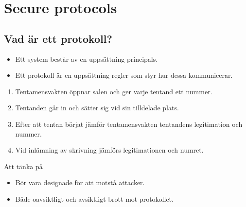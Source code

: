 \mode*




\section{Secure protocols}

\subsection{Vad är ett protokoll?}

\begin{frame}
  \begin{definition}[Protokoll]
    \begin{itemize}
      \item Ett system består av en uppsättning principals.
      \item Ett protokoll är en uppsättning regler som styr hur dessa 
        kommunicerar.
    \end{itemize}
  \end{definition}

  \pause{}

  \begin{example}
    \begin{enumerate}
      \item Tentamensvakten öppnar salen och ger varje tentand ett nummer.
      \item Tentanden går in och sätter sig vid sin tilldelade plats.
      \item Efter att tentan börjat jämför tentamensvakten tentandens 
        legitimation och nummer.
      \item Vid inlämning av skrivning jämförs legitimationen och numret.
    \end{enumerate}
  \end{example}
\end{frame}

\begin{frame}
  \begin{alertblock}{Att tänka på}
    \begin{itemize}
      \item Bör vara designade för att motstå attacker.
      \item Både oavsiktligt och avsiktligt brott mot protokollet.
    \end{itemize}
  \end{alertblock}
\end{frame}

